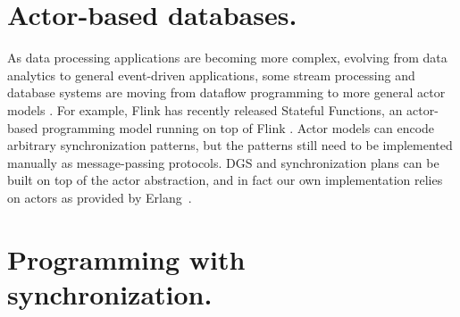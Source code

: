 \section{Actor-based databases.}
As data processing applications are becoming more complex, evolving from
data analytics to general event-driven applications, some stream
processing and database systems are moving from dataflow programming to more
general actor models
\cite{CarboneFKK20,Bernstein19,BernsteinDKM17,Das2018,xu2021move}.
For example, Flink has recently released Stateful Functions,
an actor-based programming model running on top of Flink
\cite{AkhterFK19,StatefulFunctions}.
Actor models can encode arbitrary synchronization patterns,
but the patterns still need to be implemented manually as
message-passing protocols.
DGS and synchronization plans can be built on top
of the actor abstraction, and in fact our own implementation
relies on actors as provided by Erlang~\cite{armstrong1993erlang}.

\section{Programming with synchronization.}

